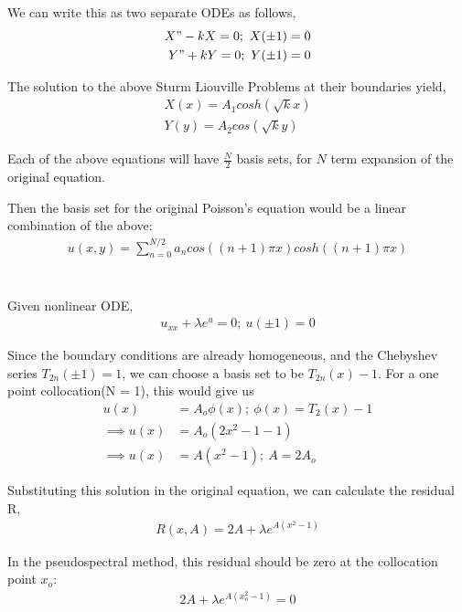 \documentclass{article}
\begin{document}
We can write this as two separate ODEs as follows,
\begin{align}
    X" - kX = 0;\ X(\pm1) = 0 \\
    Y" + kY = 0;\ Y(\pm1) = 0
\end{align}

The solution to the above Sturm Liouville Problems at their boundaries yield,
\begin{align}
    X(x) = A_1cosh(\sqrt{k}x) \\
    Y(y) = A_2cos(\sqrt{k}y)
\end{align}

Each of the above equations will have $\frac{N}{2}$ basis sets, for $N$ term expansion of the original equation.

Then the basis set for the original Poisson's equation would be a linear combination of the above:
\begin{align}
    u(x,y) = \sum_{n = 0}^{N/2}a_{n}cos((n+1)\pi x)cosh((n+1)\pi x)
\end{align}

\section{}
Given nonlinear ODE,
\begin{align}
    u_{xx} + \lambda e^u = 0;\ u(\pm1) = 0
\end{align}

Since the boundary conditions are already homogeneous, and the Chebyshev series $T_{2n}(\pm1) = 1$, we can choose a basis set to be $T_{2n}(x) - 1$. For a one point collocation(N = 1), this would give us
\begin{align}
    u(x) &= A_o\phi(x);\ \phi(x) = T_2(x) - 1 \\
    \implies u(x) &= A_o(2x^2 - 1 - 1) \\
    \implies u(x) &= A(x^2 - 1);\ A = 2A_o
\end{align}

Substituting this solution in the original equation, we can calculate the residual R,
\begin{align}
R(x, A) = 2A + \lambda e^{A(x^2 -1)}
\end{align}

In the pseudospectral method, this residual should be zero at the collocation point $x_o$:
\begin{align}
    2A + \lambda e^{A(x_o^2 -1)} = 0
\end{align}
\end{document}
